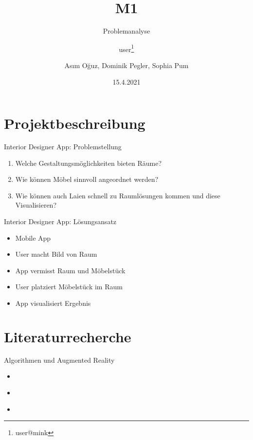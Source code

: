 \documentclass[presentation,bigger,aspectratio=169]{beamer}
\author{user\thanks{user@mink}}
\date{15.4.2021}
\title{M1}
\subtitle{Problemanalyse}
\author[A.Oğuz, D.Pegler, S.Pum]{Asım Oğuz, Dominik Pegler, Sophia Pum}
\institute{Universität Wien, Fakultät für Informatik (SS2021)}
\begin{document}
\maketitle

\section{Projektbeschreibung}
\label{sec:org5281799}
\begin{frame}[label={sec:org0de4499}]{\MakeUppercase{\insertsection}}
\end{frame}

\begin{frame}[label={sec:orgf118613}]{Interior Designer App: Problemstellung}
\begin{enumerate}
\item Welche Gestaltungsmöglichkeiten bieten Räume?
\item Wie können Möbel sinnvoll angeordnet werden?
\item Wie können auch Laien schnell zu Raumlösungen kommen und diese
Visualisieren?
\end{enumerate}
\end{frame}
\begin{frame}[label={sec:org1d49886}]{Interior Designer App: Lösungsansatz}
\begin{itemize}
\item Mobile App
\item User macht Bild von Raum
\item App vermisst Raum und Möbelstück
\item User platziert Möbelstück im Raum
\item App visualisiert Ergebnis
\end{itemize}
\end{frame}

\section{Literaturrecherche}
\label{sec:org6b271fc}
\begin{frame}[label={sec:orgb55bc73}]{\MakeUppercase{\insertsection}}
\end{frame}

\begin{frame}[label={sec:orgb00c55d}]{Algorithmen und Augmented Reality}
\begin{itemize}
\item \textcite{kanAutomatedInteriorDesign2017}
\item \textcite{sanduAugmentedRealityUses2018}
\item \textcite{moaresInterARInterior2020}
\end{itemize}
\end{frame}
\end{document}
